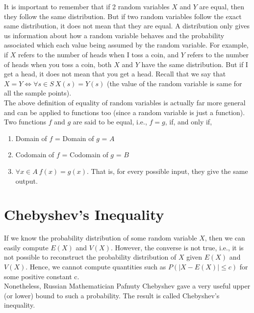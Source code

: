 \begin{note}
\end{note}
It is important to remember that if 2 random variables $X$ and $Y$ are equal, then they follow the same distribution. But if two random variables follow the exact same distribution, it does not mean that they are equal. A distribution only gives us information about how a random variable behaves and the probability associated which each value being assumed by the random variable. For example, if $X$ refers to the number of heads when I toss a coin, and $Y$ refers to the number of heads when you toss a coin, both $X$ and $Y$ have the same distribution. But if I get a head, it does not mean that you get a head. Recall that we say that $X = Y \iff \forall s \in S \ X(s) = Y(s)$ (the value of the random variable is same for all the sample points). \\
The above definition of equality of random variables is actually far more general and can be applied to functions too (since a random variable is just a function). Two functions $f$ and $g$ are said to be equal, i.e., $f = g$, if, and only if, 
\begin{enumerate}
    \item Domain of $f$ = Domain of $g$ = $A$
    \item Codomain of $f$ = Codomain of $g$ = $B$
    \item $\forall x \in A\ f(x) = g(x)$. That is, for every possible input, they give the same output.
\end{enumerate}
\section{Chebyshev's Inequality}
If we know the probability distribution of some random variable $X$, then we can easily compute $E(X)$ and $V(X)$. However, the converse is not true, i.e., it is not possible to reconstruct the probability distribution of $X$ given $E(X)$ and $V(X)$. Hence, we cannot compute quantities such as $P(|X - E(X)| \leq c)$ for some positive constant c. \\
Nonetheless, Russian Mathematician Pafnuty Chebyshev gave a very useful upper (or lower) bound to such a probability. The result is called Chebyshev's inequality.


